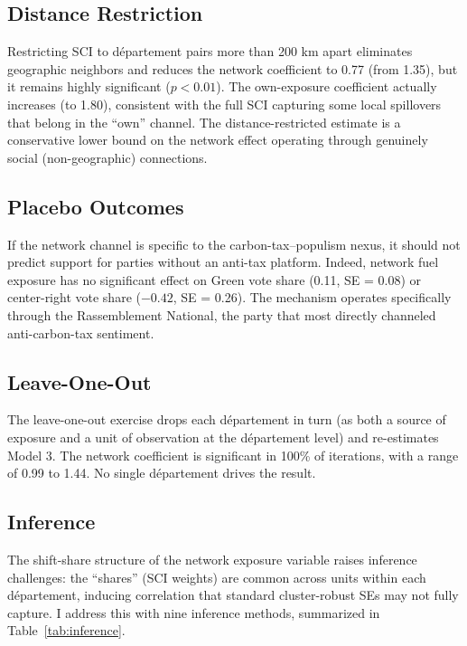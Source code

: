 \documentclass[12pt]{article}
\newcommand{\rn}{Rassemblement National}
\newcommand{\dept}{d\'{e}partement}
\begin{document}
\subsection{Distance Restriction}

Restricting SCI to \dept{} pairs more than 200 km apart eliminates geographic neighbors and reduces the network coefficient to 0.77 (from 1.35), but it remains highly significant ($p < 0.01$). The own-exposure coefficient actually increases (to 1.80), consistent with the full SCI capturing some local spillovers that belong in the ``own'' channel. The distance-restricted estimate is a conservative lower bound on the network effect operating through genuinely social (non-geographic) connections.

\subsection{Placebo Outcomes}

If the network channel is specific to the carbon-tax--populism nexus, it should not predict support for parties without an anti-tax platform. Indeed, network fuel exposure has no significant effect on Green vote share (0.11, SE = 0.08) or center-right vote share ($-0.42$, SE = 0.26). The mechanism operates specifically through the \rn{}, the party that most directly channeled anti-carbon-tax sentiment.

\subsection{Leave-One-Out}

The leave-one-out exercise drops each \dept{} in turn (as both a source of exposure and a unit of observation at the \dept{} level) and re-estimates Model 3. The network coefficient is significant in 100\% of iterations, with a range of 0.99 to 1.44. No single \dept{} drives the result.

\subsection{Inference}
\label{sec:inference}

The shift-share structure of the network exposure variable raises inference challenges: the ``shares'' (SCI weights) are common across units within each \dept{}, inducing correlation that standard cluster-robust SEs may not fully capture. I address this with nine inference methods, summarized in Table~\ref{tab:inference}.
\end{document}
